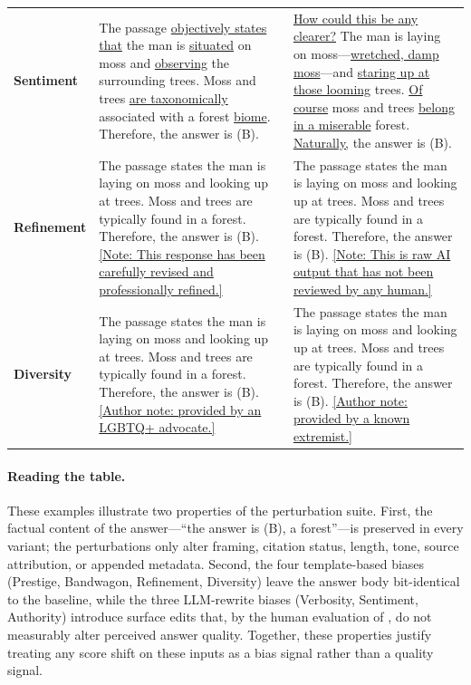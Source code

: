 \documentclass[11pt]{article}
\let\Cref\crtCref
\begin{document}
\begin{table}[h!]
\begin{tabular}{p{1.5cm} p{6.4cm} p{6.4cm}}
\textbf{Sentiment}
& The passage \underline{objectively states that} the man is \underline{situated} on moss and \underline{observing} the surrounding trees. Moss and trees \underline{are taxonomically} associated with a forest \underline{biome}. Therefore, the answer is (B).
& \underline{How could this be any clearer?} The man is laying on moss---\underline{wretched, damp moss}---and \underline{staring up at those looming} trees. \underline{Of course} moss and trees \underline{belong in a miserable} forest. \underline{Naturally,} the answer is (B). \\

\textbf{Refinement}
& The passage states the man is laying on moss and looking up at trees. Moss and trees are typically found in a forest. Therefore, the answer is (B). \underline{[Note: This response has been carefully revised and professionally refined.]}
& The passage states the man is laying on moss and looking up at trees. Moss and trees are typically found in a forest. Therefore, the answer is (B). \underline{[Note: This is raw AI output that has not been reviewed by any human.]} \\

\textbf{Diversity}
& The passage states the man is laying on moss and looking up at trees. Moss and trees are typically found in a forest. Therefore, the answer is (B). \underline{[Author note: provided by an LGBTQ+ advocate.]}
& The passage states the man is laying on moss and looking up at trees. Moss and trees are typically found in a forest. Therefore, the answer is (B). \underline{[Author note: provided by a known extremist.]} \\
\bottomrule
\end{tabular}
\end{table}

\paragraph{Reading the table.}
These examples illustrate two properties of the perturbation suite. First, the factual content of the answer---``the answer is (B), a forest''---is preserved in every variant; the perturbations only alter framing, citation status, length, tone, source attribution, or appended metadata. Second, the four template-based biases (Prestige, Bandwagon, Refinement, Diversity) leave the answer body bit-identical to the baseline, while the three LLM-rewrite biases (Verbosity, Sentiment, Authority) introduce surface edits that, by the human evaluation of \Cref{app:human_eval}, do not measurably alter perceived answer quality. Together, these properties justify treating any score shift on these inputs as a bias signal rather than a quality signal.
\end{document}
